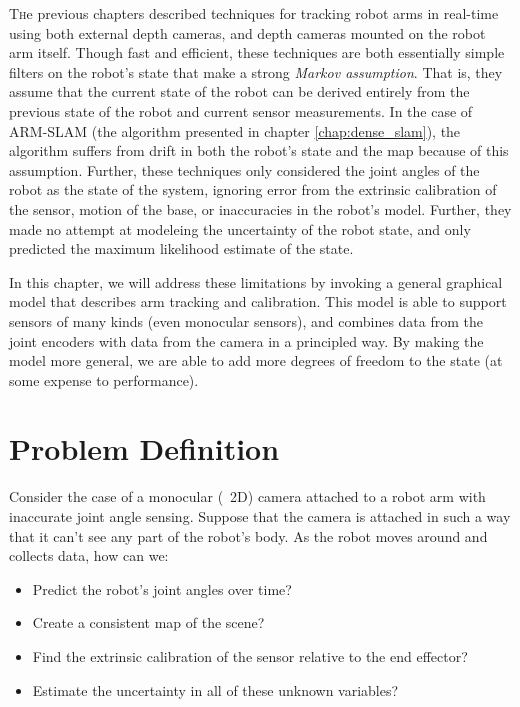 \label{chap:general_slam} 
\lettrine{T}he previous chapters described techniques for tracking robot arms in real-time using both external depth cameras, and depth cameras mounted on the robot arm itself. Though fast and efficient, these techniques are both essentially simple filters on the robot's state that make a strong \textit{Markov assumption}. That is, they assume that the current state of the robot can be derived entirely from the previous state of the robot and current sensor measurements. In the case of ARM-SLAM (the algorithm presented in chapter \ref{chap:dense_slam}), the algorithm suffers from drift in both the robot's state and the map because of this assumption. Further, these techniques only considered the joint angles of the robot as the state of the system, ignoring error from the extrinsic calibration of the sensor, motion of the base, or inaccuracies in the robot's model. Further, they made no attempt at modeleing the uncertainty of the robot state, and only predicted the maximum likelihood estimate of the state.

In this chapter, we will address these limitations by invoking a general graphical model that describes arm tracking and calibration. This model is able to support sensors of many kinds (even monocular sensors), and combines data from the joint encoders with data from the camera in a principled way. By making the model more general, we are able to add more degrees of freedom to the state (at some expense to performance).

\section{Problem Definition}
Consider the case of a monocular (\ie~2D) camera attached to a robot arm with inaccurate joint angle sensing. Suppose that the camera is attached in such a way that it can't see any part of the robot's body. As the robot moves around and collects data, how can we:

\begin{itemize}
  \item Predict the robot's joint angles over time?
  \item Create a consistent map of the scene?
  \item Find the extrinsic calibration of the sensor relative to the end effector?
  \item Estimate the uncertainty in all of these unknown variables?
\end{itemize}

